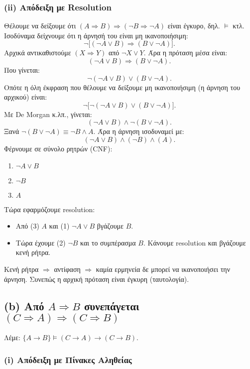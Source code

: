 \documentclass[a4paper,12pt]{article}
\begin{document}
\subsubsection*{(ii) Απόδειξη με Resolution}

Θέλουμε να δείξουμε ότι \((A \Rightarrow B) \Rightarrow (\neg B \Rightarrow \neg A)\) είναι έγκυρο, δηλ. \(\vDash\) κτλ. Ισοδύναμα δείχνουμε ότι η άρνησή του είναι μη ικανοποιήσιμη:
\[
\neg \bigl[(\neg A \lor B) \Rightarrow (B \lor \neg A)\bigr].
\]
Αρχικά αντικαθιστούμε \((X \Rightarrow Y)\) από \(\neg X \lor Y\). Άρα η πρόταση μέσα είναι:
\[
(\neg A \lor B) \Rightarrow (B \lor \neg A).
\]
Που γίνεται:
\[
\neg (\neg A \lor B) \lor (B \lor \neg A).
\]
Οπότε η όλη έκφραση που θέλουμε να δείξουμε μη ικανοποιήσιμη (η άρνηση του αρχικού) είναι:
\[
\neg \bigl[\neg (\neg A \lor B) \lor (B \lor \neg A)\bigr].
\]
Με De Morgan κ.λπ., γίνεται:
\[
(\neg A \lor B) \wedge \neg (B \lor \neg A).
\]
Ξανά \(\neg (B \lor \neg A) \equiv \neg B \wedge A\). Άρα η άρνηση ισοδυναμεί με:
\[
(\neg A \lor B) \wedge (\neg B) \wedge (A).
\]
Φέρνουμε σε σύνολο ρητρών (CNF):
\begin{enumerate}
    \item \(\neg A \lor B\)
    \item \(\neg B\)
    \item \(A\)
\end{enumerate}

Τώρα εφαρμόζουμε resolution:
\begin{itemize}
    \item Από (3) \(A\) και (1) \(\neg A \lor B\) βγάζουμε \(B\).
    \item Τώρα έχουμε (2) \(\neg B\) και το συμπέρασμα \(B\). Κάνουμε resolution και βγάζουμε κενή ρήτρα.
\end{itemize}

Κενή ρήτρα \(\Rightarrow\) αντίφαση \(\Rightarrow\) καμία ερμηνεία δε μπορεί να ικανοποιήσει την άρνηση. Συνεπώς η αρχική πρόταση είναι έγκυρη (ταυτολογία).

\subsection*{(b) Από \(A \Rightarrow B\) συνεπάγεται \((C \Rightarrow A) \Rightarrow (C \Rightarrow B)\)}

Λέμε: \(\{A \to B\} \models (C \to A) \to (C \to B)\).

\subsubsection*{(i) Απόδειξη με Πίνακες Αληθείας}
\end{document}
